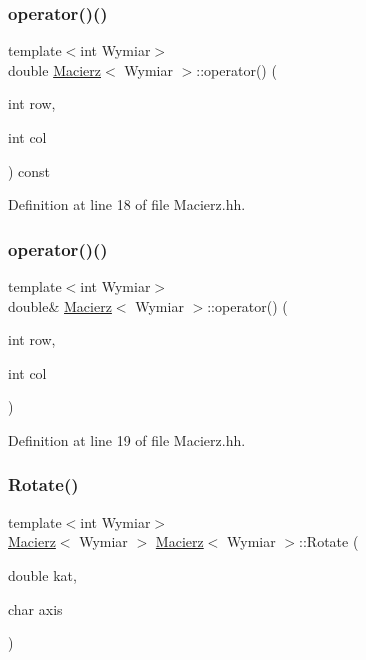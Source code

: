 \subsubsection{\texorpdfstring{operator()()}{operator()()}\hspace{0.1cm}{\footnotesize\ttfamily [1/2]}}
{\footnotesize\ttfamily template$<$int Wymiar$>$ \\
double \hyperlink{class_macierz}{Macierz}$<$ Wymiar $>$\+::operator() (\begin{DoxyParamCaption}\item[{int}]{row,  }\item[{int}]{col }\end{DoxyParamCaption}) const\hspace{0.3cm}{\ttfamily [inline]}}



Definition at line 18 of file Macierz.\+hh.

\mbox{\label{class_macierz_af32ae3d8e121a456dad8372bcfa47c6f}} 
\subsubsection{\texorpdfstring{operator()()}{operator()()}\hspace{0.1cm}{\footnotesize\ttfamily [2/2]}}
{\footnotesize\ttfamily template$<$int Wymiar$>$ \\
double\& \hyperlink{class_macierz}{Macierz}$<$ Wymiar $>$\+::operator() (\begin{DoxyParamCaption}\item[{int}]{row,  }\item[{int}]{col }\end{DoxyParamCaption})\hspace{0.3cm}{\ttfamily [inline]}}



Definition at line 19 of file Macierz.\+hh.

\mbox{\label{class_macierz_ad7d0f072e450b04740723cfa7b13af17}} 
\subsubsection{\texorpdfstring{Rotate()}{Rotate()}}
{\footnotesize\ttfamily template$<$int Wymiar$>$ \\
\hyperlink{class_macierz}{Macierz}$<$ Wymiar $>$ \hyperlink{class_macierz}{Macierz}$<$ Wymiar $>$\+::Rotate (\begin{DoxyParamCaption}\item[{double}]{kat,  }\item[{char}]{axis }\end{DoxyParamCaption})}

